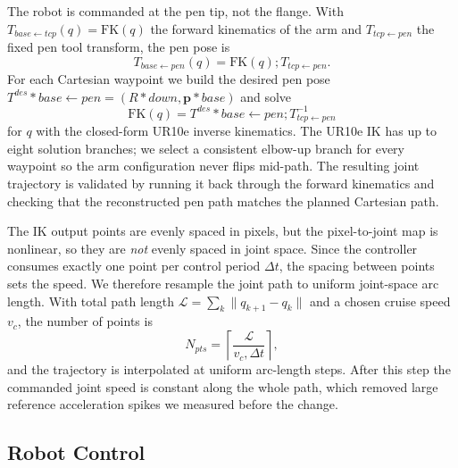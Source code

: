 \documentclass[11pt]{article}
\begin{document}
The robot is commanded at the pen tip, not the flange. With $T_{base \leftarrow tcp}(q) = \mathrm{FK}(q)$ the forward kinematics of the arm and $T_{tcp \leftarrow pen}$ the fixed pen tool transform, the pen pose is
\begin{equation}
T_{base \leftarrow pen}(q) = \mathrm{FK}(q) ; T_{tcp \leftarrow pen}.
\end{equation}
For each Cartesian waypoint we build the desired pen pose $T^{des}*{base \leftarrow pen} = (R*{down}, \mathbf{p}*{base})$ and solve
\begin{equation}
\mathrm{FK}(q) = T^{des}*{base \leftarrow pen} ; T_{tcp \leftarrow pen}^{-1}
\end{equation}
for $q$ with the closed-form UR10e inverse kinematics. The UR10e IK has up to eight solution branches; we select a consistent elbow-up branch for every waypoint so the arm configuration never flips mid-path. The resulting joint trajectory is validated by running it back through the forward kinematics and checking that the reconstructed pen path matches the planned Cartesian path.

The IK output points are evenly spaced in pixels, but the pixel-to-joint map is nonlinear, so they are \emph{not} evenly spaced in joint space. Since the controller consumes exactly one point per control period $\Delta t$, the spacing between points sets the speed. We therefore resample the joint path to uniform joint-space arc length. With total path length $\mathcal{L} = \sum_k \lVert q_{k+1} - q_k \rVert$ and a chosen cruise speed $v_c$, the number of points is
\begin{equation}
N_{pts} = \left\lceil \frac{\mathcal{L}}{v_c , \Delta t} \right\rceil,
\end{equation}
and the trajectory is interpolated at uniform arc-length steps. After this step the commanded joint speed is constant along the whole path, which removed large reference acceleration spikes we measured before the change.

\subsection{Robot Control}
\end{document}

